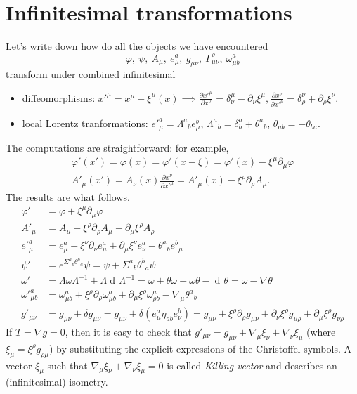 \documentclass[a4paper,12pt]{book}
\newcommand{\dd}{\mathop{\mathrm{d}\!}{}}
\theoremstyle{definition}
\theoremstyle{remark}
\begin{document}
\section{Infinitesimal transformations}
Let's write down how do all the objects we have encountered
\[\varphi,\ \psi,\ A_\mu,\ e^a_\mu,\ g_{\mu\nu},\ \Gamma^\rho_{\mu\nu},\ \omega^a_{\mu b}\]
transform under combined infinitesimal
\begin{itemize}
\item diffeomorphisms: $x'^\mu=x^\mu-\xi^\mu(x)\implies\frac{\partial x'^\mu}{\partial x^\nu}=\delta^\mu_\nu-\partial_\nu\xi^\mu,\frac{\partial x^\nu}{\partial x'^\rho}=\delta^\nu_\rho+\partial_\rho\xi^\nu$.
\item local Lorentz tranformations: $e'^a_\mu=\Lambda^a{}_be^b_\mu$, $\Lambda^a{}_b=\delta^a_b+\theta^a{}_b$, $\theta_{ab}=-\theta_{ba}$.
\end{itemize}
The computations are straightforward: for example,
\begin{gather*}
\varphi'(x')=\varphi(x)=\varphi'(x-\xi)=\varphi'(x)-\xi^\mu\partial_\mu\varphi\\
A'_\mu(x')=A_\nu(x)\frac{\partial x^\nu}{\partial x'^\mu}=A'_\mu(x)-\xi^\rho\partial_\rho A_\mu.
\end{gather*}
The results are what follows.
\begin{align*}
\varphi'&=\varphi+\xi^\mu\partial_\mu\varphi\\
A'_\mu&=A_\mu+\xi^\rho\partial_\rho A_\mu+\partial_\mu\xi^\rho A_\rho\\
e'^a_\mu&=e^a_\mu+\xi^\nu\partial_\nu e^a_\mu+\partial_\mu\xi^\nu e^a_\nu+\theta^a{}_b e^b{}_\mu\\
\psi'&=e^{\Sigma^a{}_b\theta^b{}_a}\psi=\psi+\Sigma^a{}_b\theta^b{}_a\psi\\
\omega'&=\Lambda\omega\Lambda^{-1}+\Lambda\dd\Lambda^{-1}=\omega+\theta\omega-\omega\theta-\dd\theta=\omega-\nabla\theta\\
\omega'^a_{\mu b}&=\omega^a_{\mu b}+\xi^\rho\partial_\rho\omega^a_{\mu b}+\partial_\mu\xi^\rho\omega^a_{\rho b}-\nabla_\mu\theta^a{}_b\\
g'_{\mu\nu}&=g_{\mu\nu}+\delta g_{\mu\nu}=g_{\mu\nu}+\delta(e^a_\mu\eta_{ab}e^b_\nu)=g_{\mu\nu}+\xi^\rho\partial_\rho g_{\mu\nu}+\partial_\nu\xi^\rho g_{\mu\rho}+\partial_\mu\xi^\rho g_{\nu\rho}
\end{align*}
If $T=\nabla g=0$, then it is easy to check that $g'_{\mu\nu}=g_{\mu\nu}+\nabla_\mu\xi_\nu+\nabla_\nu\xi_\mu$ (where $\xi_\mu=\xi^\rho g_{\rho\mu}$) by substituting the explicit expressions of the Christoffel symbols. A vector $\xi_\mu$ such that $\nabla_\mu\xi_\nu+\nabla_\nu\xi_\mu=0$ is called \emph{Killing vector} and describes an (infinitesimal) isometry.
\end{document}
